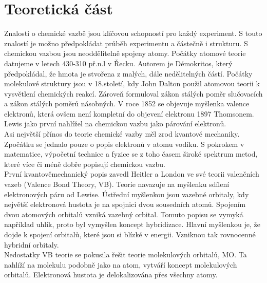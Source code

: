 \documentclass[
  digital, %
  table,   %
  lof,     %
  lot,     %
]{fithesis3}
\begin{document}
\chapter{Teoretická část}
Znalosti o chemické vazbě jsou klíčovou schopností pro každý experiment. S touto znalostí je možno předpokládat průběh experimentu a částečně i strukturu. S chemickou vazbou jsou neoddělitelně spojeny atomy. Počátky atomové teorie datujeme v letech 430-310 př.n.l v Řecku. Autorem je Démokritos, který předpokládal, že hmota je stvořena z malých, dále nedělitelných částí. Počátky molekulové struktury jsou v 18.století, kdy John Dalton použil atomovou teorii k vysvětlení chemických reakcí. Zároveň formuloval zákon stálých poměr slučovacích a zákon stálých poměrů násobných. V roce 1852 se objevuje myšlenka valence elektronů, která ovšem není kompletní do objevení elektronu 1897 Thomsonem. \\
Lewis jako první nahlížel na chemickou vazbu jako párování elektronů. \cite{Munzarova1996thesis} \\
Asi největší přínos do teorie chemické vazby měl zrod kvantové mechaniky. Zpočátku se jednalo pouze o popis elektronů v atomu vodíku. S pokrokem v matematice, výpočetní technice a fyzice se z toho časem široké spektrum metod, které více či méně dobře popisují chemickou vazbu.\\
První kvantověmechanický popis zavedl Heitler a London ve své teorii valenčních vazeb (Valence Bond Theory, VB). Teorie navazuje na myšlenku sdílení elektronových páru od Lewise. Ústřední myšlenkou jsou vazebné orbitaly, kdy největší elektronová hustota je na spojnici dvou sousedních atomů. Spojením dvou atomových orbitalů vzniká vazebný orbital. Tomuto popisu se vymyká například uhlík, proto byl vymyšlen koncept hybridizace. Hlavní myšlenkou je, že dojde k spojení orbitalů, které jsou si blízké v energii. Vzniknou tak rovnocenné hybridní orbitaly. \cite{Munzarova1996thesis} \\
Nedostatky VB teorie se pokusila řešit teorie molekulových orbitalů, MO. Ta nahlíží na molekulu podobně jako na atom, vytváří koncept molekulových orbitalů. Elektronová hustota je delokalizována přes všechny atomy.\cite{Munzarova1996thesis} \\
\end{document}
